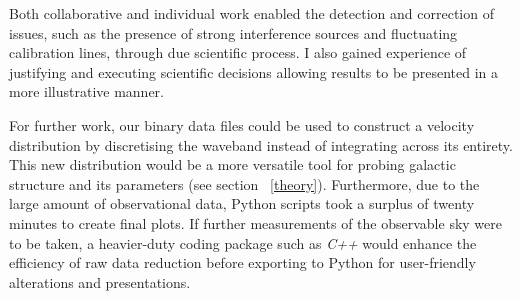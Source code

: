 \documentclass[11pt]{article} %
\begin{document}
Both collaborative and individual work enabled the detection and correction of issues, such as the presence of strong interference sources and fluctuating calibration lines, through due scientific process. I also gained experience of justifying and executing scientific decisions allowing results to be presented in a more illustrative manner.

For further work, our binary data files could be used to construct a velocity distribution by discretising the waveband instead of integrating across its entirety. This new distribution would be a more versatile tool for probing galactic structure and its parameters (see section ~\ref{theory}). Furthermore, due to the large amount of observational data, Python scripts took a surplus of twenty minutes to create final plots. If further measurements of the observable sky were to be taken, a heavier-duty coding package such as \textit{C++} would enhance the efficiency of raw data reduction before exporting to Python for user-friendly alterations and presentations.
\end{document}
